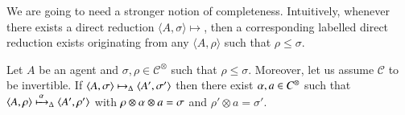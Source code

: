 \documentclass[main.tex]{subfiles}
\begin{document}
We are going to need a stronger notion of completeness. Intuitively, whenever there exists a direct reduction $\langle A, \sigma \rangle \mapsto$, then a corresponding labelled direct reduction exists originating from any $\langle A, \rho \rangle$ such that $\rho \leq \sigma$.

\begin{lemma}[Completeness]\label{lemma:completeness}
Let $A$ be an agent and $\sigma, \rho \in \mathcal{C}^\otimes$ such that $\rho \leq \sigma$.
%
Moreover, let us assume $\mathcal{C}$ to be invertible.
%
If $\langle A,\sigma \rangle \mapsto_\Delta \langle A',\sigma' \rangle$ then there exist $\alpha, a \in C^\otimes$ such that
$\langle A,\rho \rangle \xmapsto{\, \alpha\,}_\Delta \langle A',\rho' \rangle$ with $\rho \otimes \alpha \otimes a = \sigma$ and $\rho' \otimes a = \sigma'$.
\end{lemma}
\end{document}
